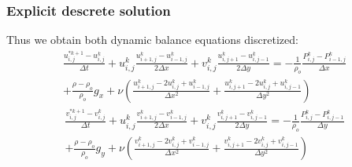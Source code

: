 \documentclass[xcolor=dvipsnames,10pt,aspectratio=169]{beamer}
\begin{document}
\begin{frame}
	\frametitle{Explicit descrete solution}
	Thus we obtain both dynamic balance equations discretized:
	\begin{equation}
		\begin{split}
		\frac{u_{i , j}^{\ast k + 1} - u_{i , j}^{k}}{\Delta t} + u_{i , j}^{k}\frac{u_{i + 1 , j}^k - u_{i - 1 , j}^k  }{2 \Delta x} + v_{i , j}^{k}\frac{u_{i , j+ 1}^k - u_{i, j-1}^k  }{2 \Delta y} =  -\frac{1}{\rho_o} \frac{P_{i, j}^k - P_{i - 1 , j}^k}{\Delta x} \\ + \frac{\rho - 	\rho_o}{\rho_o} g_x + \nu \left( \frac{u_{i+1 , j}^{k} - 2 u_{i,j}^{k} + u_{i-1,j}^{k}}{\Delta x^2} + \frac{u_{i , j+1}^{k} - 2 u_{i,j}^{k} + u_{i,j-1}^{k}}{\Delta y^2} \right)
		\end{split}
	\end{equation}
	\begin{equation}
		\begin{split}
		\frac{v_{i , j}^{\ast k + 1} - v_{i , j}^{k}}{\Delta t} + u_{i , j}^{k}\frac{v_{i + 1 , j}^k - v_{i - 1 , j}^k  }{2 \Delta x} + v_{i , j}^{k}\frac{v_{i , j+ 1}^k - v_{i, j-1}^k  }{2 \Delta y} =  -\frac{1}{\rho_o} \frac{P_{i , j}^k - P_{i , j - 1}^k}{\Delta y} \\ + \frac{\rho - \rho_o}{\rho_o} g_y + \nu \left( \frac{v_{i+1 , j}^{k} - 2 v_{i,j}^{k} + v_{i-1,j}^{k}}{\Delta x^2} + \frac{v_{i , j+1}^{k} - 2 v_{i,j}^{k} + v_{i,j-1}^{k}}{\Delta y^2} \right)
		\end{split}
	\end{equation}
\end{frame}
\end{document}
